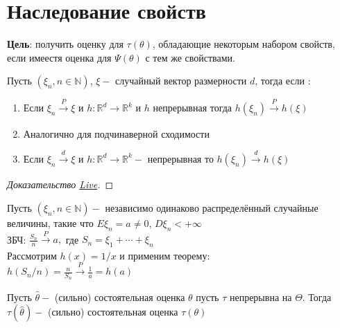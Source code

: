 \documentclass[11pt,fleqn]{book} %
\def\t{\theta}
\def\T{\Theta}
\def\H{\hat{\theta}}
\def\d{\xrightarrow[] {d}}
\def\PT{\xrightarrow[] {P}}
\begin{document}
\section{Наследование свойств}
\textbf{Цель}: получить оценку для $\tau(\t)$, обладающие некоторым набором свойств, если имеестя оценка для  $\Psi(\t)$ с тем же свойствами. 

\begin{theorem}
\label{th_nasledovanoiy_shod}
Пусть $(\xi_n , n\in \mathbb{N})$, $\xi - $ случайный вектор размерности $d$, тогда если :
\begin{enumerate}
\item Если $\xi_n \PT \xi$ и $h: \mathbb{R}^d \rightarrow \mathbb{R}^k$ и $h$ непрерывная тогда $ h(\xi_n) \PT h(\xi)$ 
\item Аналогично для подчинаверной сходимости 
\item Если $\xi_n \d \xi$ и $h: \mathbb{R}^d \rightarrow \mathbb{R}^k - $ непрерывная то $h(\xi_n) \d h(\xi)$
\end{enumerate}
\end{theorem}
\begin{proof}[Доказательство \href{https://youtu.be/EL-V_0kWRoI?t=951}{Live}] 


\end{proof}

\begin{exa}
Пусть  $(\xi_n , n\in \mathbb{N}) - $ независимо одинаково распределённый случайные величины, такие что $E \xi_n = a \neq 0$, $D\xi_n < + \infty$ \\ ЗБЧ: $\frac{S_n}{n} \PT a, $ где $S_n = \xi_1 + \cdots + \xi_n$ \\ Рассмотрим $h(x) = 1/x$ и применим теорему: \\ $h(S_n/n) = \frac{n}{S_n} \PT \frac{1}{a} = h(a)$   
\end{exa}

\begin{proposition}
Пусть $\H -$ (сильно) состоятельная оценка $\t$ пусть $\tau$ непрерывна на $\T$. Тогда $\tau(\H) - $ (сильно) состоятельная оценка $\tau(\t)$ 
\end{proposition}
\end{document}
